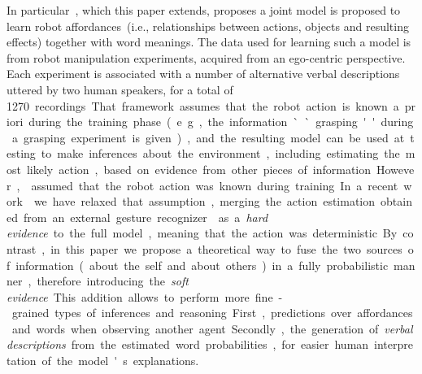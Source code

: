 In particular~\cite{salvi:2012:smcb}, which this paper extends, proposes a joint model is proposed to learn robot affordances~(i.e., relationships between actions, objects and resulting effects) together with word meanings.
The data used for learning such a model is from robot manipulation experiments, acquired from an ego-centric perspective.
Each experiment is associated with a number of alternative verbal descriptions uttered by two human speakers, for a total of \SI{1270}~recordings.
That framework assumes that the robot action is known a~priori during the training phase~(e.g., the information ``grasping'' during a grasping experiment is given), and the resulting model can be used at testing to make inferences about the environment, including estimating the most likely action, based on evidence from other pieces of information.
However,~\cite{salvi:2012:smcb} assumed that the robot action was known during training.
In a recent work~\cite{saponaro:2017:glu} we have relaxed that assumption, merging the action estimation obtained from an external gesture recognizer~\cite{saponaro:2013:crhri} as a \emph{hard evidence} to the full model, meaning that the action was deterministic.
By contrast, in this paper we propose a theoretical way to fuse the two sources of information~(about the self and about others) in a fully probabilistic manner, therefore introducing the \emph{soft evidence}.
This addition allows to perform more fine-grained types of inferences and reasoning. %
First, predictions over affordances and words when observing another agent.
Secondly, the generation of \emph{verbal descriptions} from the estimated word probabilities, for easier human interpretation of the model's explanations.

